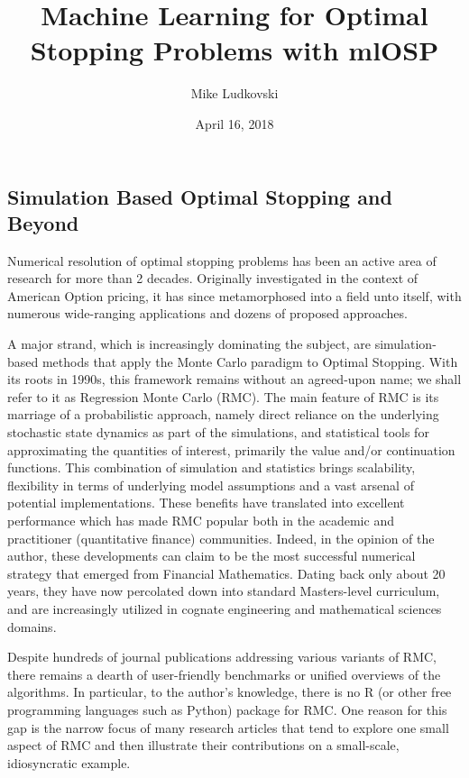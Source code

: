 \documentclass[]{article}
\title{Machine Learning for Optimal Stopping Problems with mlOSP}
\author{Mike Ludkovski}
\date{April 16, 2018}
\begin{document}
\maketitle

{
\setcounter{tocdepth}{3}
\tableofcontents
}
\subsection{Simulation Based Optimal Stopping and
Beyond}\label{simulation-based-optimal-stopping-and-beyond}

Numerical resolution of optimal stopping problems has been an active
area of research for more than 2 decades. Originally investigated in the
context of American Option pricing, it has since metamorphosed into a
field unto itself, with numerous wide-ranging applications and dozens of
proposed approaches.

A major strand, which is increasingly dominating the subject, are
simulation-based methods that apply the Monte Carlo paradigm to Optimal
Stopping. With its roots in 1990s, this framework remains without an
agreed-upon name; we shall refer to it as Regression Monte Carlo (RMC).
The main feature of RMC is its marriage of a probabilistic approach,
namely direct reliance on the underlying stochastic state dynamics as
part of the simulations, and statistical tools for approximating the
quantities of interest, primarily the value and/or continuation
functions. This combination of simulation and statistics brings
scalability, flexibility in terms of underlying model assumptions and a
vast arsenal of potential implementations. These benefits have
translated into excellent performance which has made RMC popular both in
the academic and practitioner (quantitative finance) communities.
Indeed, in the opinion of the author, these developments can claim to be
the most successful numerical strategy that emerged from Financial
Mathematics. Dating back only about 20 years, they have now percolated
down into standard Masters-level curriculum, and are increasingly
utilized in cognate engineering and mathematical sciences domains.

Despite hundreds of journal publications addressing various variants of
RMC, there remains a dearth of user-friendly benchmarks or unified
overviews of the algorithms. In particular, to the author's knowledge,
there is no R (or other free programming languages such as Python)
package for RMC. One reason for this gap is the narrow focus of many
research articles that tend to explore one small aspect of RMC and then
illustrate their contributions on a small-scale, idiosyncratic example.
\end{document}

